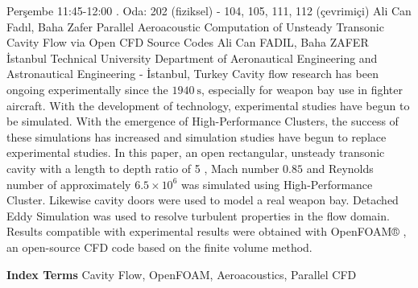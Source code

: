 
    \begin{abstract_basarim}
    {Perşembe 11:45-12:00}
    {.}
    {Oda: 202 (fiziksel) - 104, 105, 111, 112 (çevrimiçi)}
    {Ali Can Fadıl, Baha Zafer}
    {Parallel Aeroacoustic Computation of Unsteady Transonic Cavity Flow via Open CFD Source Codes}
    {%
    Ali Can FADIL, Baha ZAFER}
    {%
    }
    {%
    İstanbul Technical University Department of Aeronautical Engineering and Astronautical Engineering - İstanbul, Turkey}
    Cavity flow research has been ongoing experimentally since the $1940 \mathrm{~s}$, especially for weapon bay use in fighter aircraft. With the development of technology, experimental studies have begun to be simulated. With the emergence of High-Performance Clusters, the success of these simulations has increased and simulation studies have begun to replace experimental studies. In this paper, an open rectangular, unsteady transonic cavity with a length to depth ratio of 5 , Mach number $0.85$ and Reynolds number of approximately $6.5 \times 10^{6}$ was simulated using High-Performance Cluster. Likewise cavity doors were used to model a real weapon bay. Detached Eddy Simulation was used to resolve turbulent properties in the flow domain. Results compatible with experimental results were obtained with OpenFOAM® , an open-source CFD code based on the finite volume method. 
    
            \textbf{Index Terms} \newline{}Cavity Flow, OpenFOAM, Aeroacoustics, Parallel CFD
    \end{abstract_basarim}
    